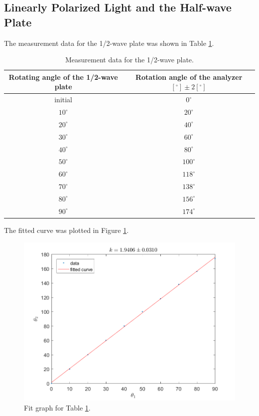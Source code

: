 \documentclass{article}
\begin{document}
\newpage

\subsection{Linearly Polarized Light and the Half-wave Plate}

The measurement data for the 1/2-wave plate was shown in Table \ref{tab-2}.

\begin{table}[!h]
\begin{center}
\begin{tabular}{|c|c|}
\hline
Rotating angle of the 1/2-wave plate&Rotation angle of the analyzer $[^\circ]\pm2[^\circ]$\\
\hline
initial		&	$0^\circ$	\\
\hline
$10^\circ$	&	$20^\circ$	\\
\hline
$20^\circ$	&	$40^\circ$	\\
\hline
$30^\circ$	&	$60^\circ$	\\
\hline
$40^\circ$	&	$80^\circ$	\\
\hline
$50^\circ$	&	$100^\circ$	\\
\hline
$60^\circ$	&	$118^\circ$	\\
\hline
$70^\circ$	&	$138^\circ$	\\
\hline
$80^\circ$	&	$156^\circ$	\\
\hline
$90^\circ$	&	$174^\circ$	\\
\hline
\end{tabular}
\caption{Measurement data for the 1/2-wave plate.}
\label{tab-2}
\end{center}
\end{table}

The fitted curve was plotted in Figure \ref{fig-2}.\\

\begin{figure}[H]
\centering
\includegraphics[scale=0.5]{fig2.png}
\caption{Fit graph for Table \ref{tab-2}.}
\label{fig-2}
\end{figure}
\end{document}
